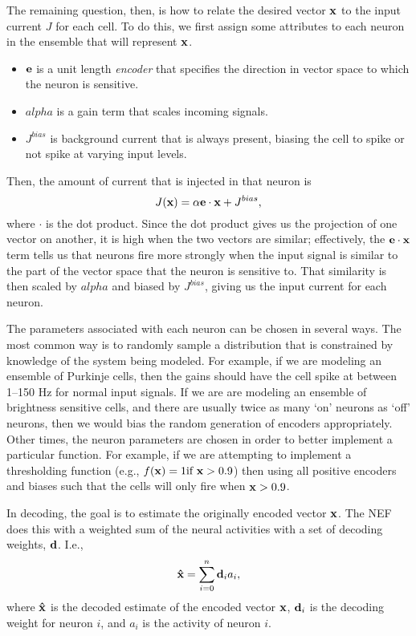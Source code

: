 The remaining question, then,
is how to relate the desired vector
$\mathbf{x}$ to the input current
$J$ for each cell.
To do this, we first assign some
attributes to each neuron in the ensemble
that will represent $\mathbf{x}$.
\begin{itemize}
  \item $\mathbf{e}$ is a unit length \textit{encoder}
    that specifies the direction in vector space
    to which the neuron is sensitive.
  \item $alpha$ is a gain term that scales
    incoming signals.
  \item $J^{bias}$ is background current that
    is always present, biasing the cell
    to spike or not spike at varying input levels.
\end{itemize}
Then, the amount of current that is injected
in that neuron is
\begin{equation}
  J(\mathbf{x}) = \alpha \mathbf{e} \cdot \mathbf{x} + J^{bias},
\end{equation}
where $\cdot$ is the dot product.
Since the dot product gives us
the projection of one vector on another,
it is high when the two vectors are similar;
effectively, the $\mathbf{e} \cdot \mathbf{x}$ term
tells us that neurons fire
more strongly when the input signal
is similar to the part of the vector space
that the neuron is sensitive to.
That similarity is then scaled by $alpha$
and biased by $J^{bias}$,
giving us the input current for each neuron.

The parameters associated with each neuron
can be chosen in several ways.
The most common way is to randomly sample
a distribution that is constrained
by knowledge of the system being modeled.
For example, if we are modeling an ensemble
of Purkinje cells, then the gains should
have the cell spike at between 1--150 Hz
for normal input signals.
If we are are modeling
an ensemble of brightness sensitive cells,
and there are usually
twice as many `on' neurons as `off' neurons,
then we would bias the
random generation of encoders appropriately.
Other times, the neuron parameters
are chosen in order to better implement
a particular function.
For example, if we are attempting to
implement a thresholding function
(e.g., $f(\mathbf{x}) = 1 \text{if } \mathbf{x} > 0.9$)
then using all positive encoders
and biases such that the cells
will only fire when $\mathbf{x} > 0.9$.

In decoding, the goal is to estimate
the originally encoded vector $\mathbf{x}$.
The NEF does this with a weighted sum
of the neural activities with a set
of decoding weights, $\mathbf{d}$.
I.e.,
\begin{equation}
  \label{vec}
  \mathbf{\hat{x}} = \sum_{i=0}^n \mathbf{d}_i a_i,
\end{equation}
where $\mathbf{\hat{x}}$ is the
decoded estimate of the encoded vector $\mathbf{x}$,
$\mathbf{d}_i$ is the decoding weight for neuron $i$,
and $a_i$ is the activity of neuron $i$.

